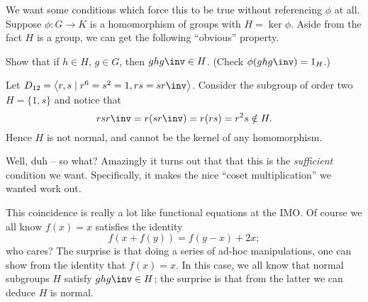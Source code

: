 We want some conditions which force this to be true without referencing $\phi$ at all.
Suppose $\phi : G \to K$ is a homomorphism of groups with $H = \ker\phi$.
Aside from the fact $H$ is a group, we can get the following ``obvious'' property.
\begin{ques}
	Show that if $h \in H$, $g \in G$,
	then $ghg\inv \in H$.
	(Check $\phi(ghg\inv) = 1_H$.)
\end{ques}
\begin{example}
	Let $D_{12} = \left<r,s \mid r^6=s^2=1, rs=sr\inv\right>$.
	Consider the subgroup of order two $H = \{1,s\}$
	and notice that \[ rsr\inv = r(sr\inv)= r(rs) = r^2s \notin H. \]
	Hence $H$ is not normal, and cannot be the kernel of any homomorphism.
\end{example}
Well, duh -- so what?
Amazingly it turns out that that this is the \emph{sufficient} condition we want.
Specifically, it makes the nice ``coset multiplication'' we wanted work out.
\begin{remark}
This coincidence is really a lot like functional equations at the IMO.
Of course we all know $f(x) = x$ satisfies the identity 
\[ f(x+f(y)) = f(y-x)+2x; \]
who cares?
The surprise is that doing a series of ad-hoc manipulations,
one can show from the identity that $f(x) = x$.
In this case, we all know that normal subgroups $H$ satisfy $ghg\inv \in H$;
the surprise is that from the latter we can deduce $H$ is normal.
\end{remark}


